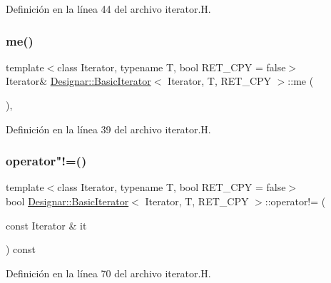 Definición en la línea 44 del archivo iterator.\+H.

\mbox{\label{class_designar_1_1_basic_iterator_a5b550cbd8bb7ee464e8cdb6b023c437a}} 
\subsubsection{\texorpdfstring{me()}{me()}}
{\footnotesize\ttfamily template$<$class Iterator, typename T, bool R\+E\+T\+\_\+\+C\+PY = false$>$ \\
Iterator\& \hyperlink{class_designar_1_1_basic_iterator}{Designar\+::\+Basic\+Iterator}$<$ Iterator, T, R\+E\+T\+\_\+\+C\+PY $>$\+::me (\begin{DoxyParamCaption}{ }\end{DoxyParamCaption})\hspace{0.3cm}{\ttfamily [inline]}, {\ttfamily [protected]}}



Definición en la línea 39 del archivo iterator.\+H.

\mbox{\label{class_designar_1_1_basic_iterator_aea51bca6ffed62c081aefbcb804a21f1}} 
\subsubsection{\texorpdfstring{operator"!=()}{operator!=()}}
{\footnotesize\ttfamily template$<$class Iterator, typename T, bool R\+E\+T\+\_\+\+C\+PY = false$>$ \\
bool \hyperlink{class_designar_1_1_basic_iterator}{Designar\+::\+Basic\+Iterator}$<$ Iterator, T, R\+E\+T\+\_\+\+C\+PY $>$\+::operator!= (\begin{DoxyParamCaption}\item[{const Iterator \&}]{it }\end{DoxyParamCaption}) const\hspace{0.3cm}{\ttfamily [inline]}}



Definición en la línea 70 del archivo iterator.\+H.

